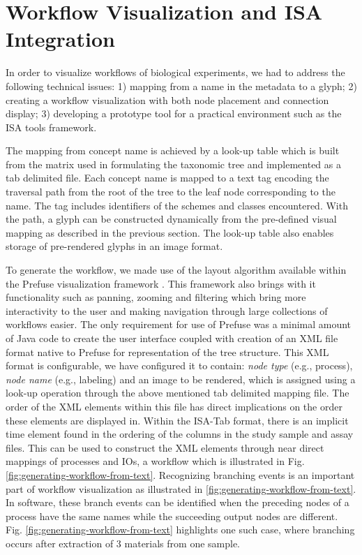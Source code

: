 \section{Workflow Visualization and ISA Integration}
\label{sec:Workflow}

In order to visualize workflows of biological experiments, we had to address the following technical issues:
1) mapping from a name in the metadata to a glyph;
2) creating a workflow visualization with both node placement and connection display;
3) developing a prototype tool for a practical environment such as the ISA tools framework.

The mapping from concept name is achieved by a look-up table which is built from the matrix used in formulating the taxonomic tree and implemented as a tab delimited file.
Each concept name is mapped to a text tag encoding the traversal path from the root of the tree to the leaf node corresponding to the name.
The tag includes identifiers of the schemes and classes encountered.
With the path, a glyph can be constructed dynamically from the pre-defined visual mapping as described in the previous section.
The look-up table also enables storage of pre-rendered glyphs in an image format.

To generate the workflow, we made use of the layout algorithm available within the Prefuse visualization framework \cite{heer05}. This framework also brings with it functionality such as panning, zooming and filtering which bring more interactivity to the user and making navigation through large collections of workflows easier. The only requirement for use of Prefuse was a minimal amount of Java code to create the user interface coupled with creation of an XML file format native to Prefuse for representation of the tree structure. This XML format is configurable, we have configured it to contain: \emph{node type} (e.g., process), \emph{node
name} (e.g., labeling) and an image to be rendered, which is assigned using a look-up operation through the above mentioned tab delimited mapping file. The order of the XML elements within this file has direct implications on the order these elements are displayed in. Within the ISA-Tab format, there is an implicit time element found in the ordering of the columns in the study sample and assay files. This can be used to construct the XML elements through near direct mappings of processes and IOs, a workflow which is illustrated in Fig. \ref{fig:generating-workflow-from-text}. Recognizing branching events is an important part of workflow visualization as illustrated in \ref{fig:generating-workflow-from-text}. In software, these branch events can be identified when the preceding nodes of a process have the same names while the succeeding output nodes are different. Fig. \ref{fig:generating-workflow-from-text} highlights one such case, where branching occurs after extraction of 3 materials from one sample. 

